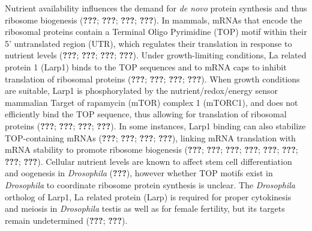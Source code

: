 \documentclass[12pt,oneside]{reedthesis}
\begin{document}
Nutrient availability influences the demand for \emph{de novo} protein synthesis and thus ribosome biogenesis ({\textbf{???}}; {\textbf{???}}; {\textbf{???}}; {\textbf{???}}). In mammals, mRNAs that encode the ribosomal proteins contain a Terminal Oligo Pyrimidine (TOP) motif within their 5' untranslated region (UTR), which regulates their translation in response to nutrient levels ({\textbf{???}}; {\textbf{???}}; {\textbf{???}}; {\textbf{???}}). Under growth-limiting conditions, La related protein 1 (Larp1) binds to the TOP sequences and to mRNA caps to inhibit translation of ribosomal proteins ({\textbf{???}}; {\textbf{???}}; {\textbf{???}}; {\textbf{???}}). When growth conditions are suitable, Larp1 is phosphorylated by the nutrient/redox/energy sensor mammalian Target of rapamycin (mTOR) complex 1 (mTORC1), and does not efficiently bind the TOP sequence, thus allowing for translation of ribosomal proteins ({\textbf{???}}; {\textbf{???}}; {\textbf{???}}; {\textbf{???}}). In some instances, Larp1 binding can also stabilize TOP-containing mRNAs ({\textbf{???}}; {\textbf{???}}; {\textbf{???}}; {\textbf{???}}), linking mRNA translation with mRNA stability to promote ribosome biogenesis ({\textbf{???}}; {\textbf{???}}; {\textbf{???}}; {\textbf{???}}; {\textbf{???}}; {\textbf{???}}; {\textbf{???}}; {\textbf{???}}). Cellular nutrient levels are known to affect stem cell differentiation and oogenesis in \emph{Drosophila} ({\textbf{???}}), however whether TOP motifs exist in \emph{Drosophila} to coordinate ribosome protein synthesis is unclear. The \emph{Drosophila} ortholog of Larp1, La related protein (Larp) is required for proper cytokinesis and meiosis in \emph{Drosophila} testis as well as for female fertility, but its targets remain undetermined ({\textbf{???}}; {\textbf{???}}).
\end{document}
